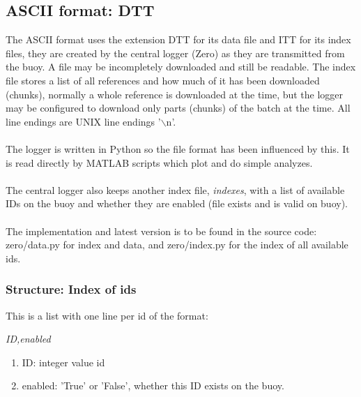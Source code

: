 \documentclass[a4paper]{article}
\begin{document}
\begin{multicols}{2}
  \subsection{ASCII format: DTT}
  The ASCII format uses the extension DTT for its data file and ITT for
  its index files, they are created by the central logger (Zero) as
  they are transmitted from the buoy. A file may be incompletely
  downloaded and still be readable. The index file stores a list of all
  references and how much of it has been downloaded (chunks), normally
  a whole reference is downloaded at the time, but the logger may be
  configured to download only parts (chunks) of the batch at the time.
  All line endings are UNIX line endings '$\backslash$n'.

  \paragraph{}The logger is written in Python so the file format has
  been influenced by this. It is read directly by MATLAB scripts
  which plot and do simple analyzes.

  \paragraph{}The central logger also keeps another index file,
  \textit{indexes}, with a list of available IDs on the buoy and whether
  they are enabled (file exists and is valid on buoy).

  \paragraph{}The implementation and latest version is to be found in
  the source code: zero/data.py for index and data, and zero/index.py
  for the index of all available ids.

  \subsubsection{Structure: Index of ids}
  This is a list with one line per id of the format: \\
  \begin{center}
  \textit{ID,enabled}
  \end{center}

  \begin{enumerate}
    \item ID: integer value id
    \item enabled: 'True' or 'False', whether this ID exists on the
      buoy.
  \end{enumerate}


\end{multicols}
\end{document}
